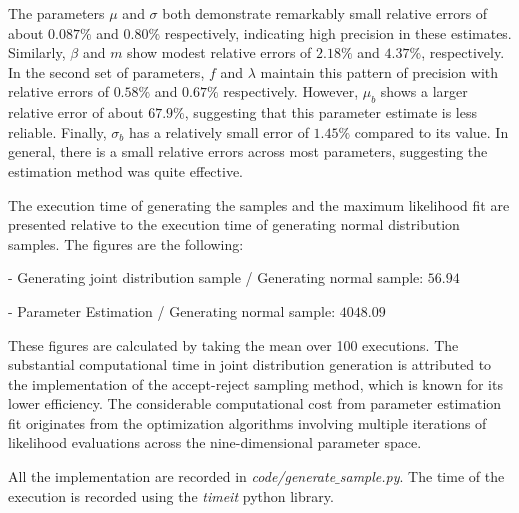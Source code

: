 \documentclass[a4paper, 12pt]{article}
\begin{document}
\par 
The parameters $\mu$ and $\sigma$ both demonstrate remarkably small relative errors of about $0.087\%$ and $0.80\%$ respectively, indicating high precision in these estimates. Similarly, $\beta$ and $m$ show modest relative errors of $2.18\%$ and $4.37\%$, respectively. In the second set of parameters, $f$ and $\lambda$ maintain this pattern of precision with relative errors of $0.58\%$ and $0.67\%$ respectively. However, $\mu_{b}$ shows a larger relative error of about $67.9\%$, suggesting that this parameter estimate is less reliable. Finally, $\sigma_{b}$ has a relatively small error of $1.45\%$ compared to its value. In general, there is a small relative errors across most parameters, suggesting the estimation method was quite effective.
\\
\par The execution time of generating the samples and the maximum likelihood fit are presented relative to the execution time of generating normal distribution samples. The figures are the following:
\par - Generating joint distribution sample / Generating normal sample: $56.94$
\par - Parameter Estimation / Generating normal sample: $4048.09$ 
\par These figures are calculated by taking the mean over 100 executions. The substantial computational time in joint distribution generation is attributed to the implementation of the accept-reject sampling method, which is known for its lower efficiency. The considerable computational cost from parameter estimation fit originates from the optimization algorithms involving multiple iterations of likelihood evaluations across the nine-dimensional parameter space.
\par All the implementation are recorded in \textit{code/generate$\_$sample.py}. The time of the execution is recorded using the \textit{timeit} python library. 
\end{document}
